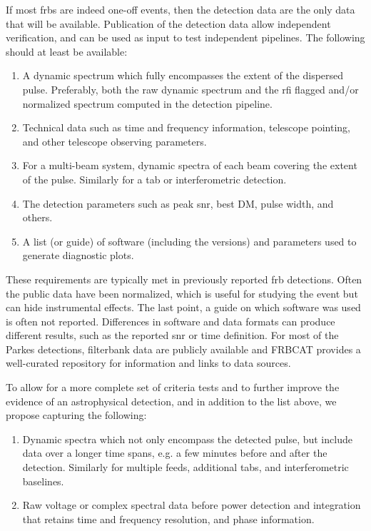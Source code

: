 \documentclass[a4paper,fleqn,usenatbib]{mnras}
\begin{document}
If most \glspl{frb} are indeed one-off events, then the detection data are the
only data that will be available. Publication of the detection data allow independent
verification, and can be used as input to test independent
pipelines. The following should at least be available:

\begin{enumerate}
    \item A dynamic spectrum which fully encompasses the extent of the dispersed
    pulse. Preferably, both the raw dynamic spectrum and the \gls{rfi} flagged
    and/or normalized spectrum computed in the detection pipeline.
    \item Technical data such as time and frequency information, telescope
    pointing, and other telescope observing parameters.
    \item For a multi-beam system, dynamic spectra of each beam covering the
    extent of the pulse. Similarly for a \gls{tab} or interferometric detection.
    \item The detection parameters such as peak \gls{snr}, best DM, pulse width,
    and others.
    \item A list (or guide) of software (including the versions) and parameters used
    to generate diagnostic plots.
\end{enumerate}

These requirements are typically met in previously reported \gls{frb}
detections. Often the public data have been normalized, which is useful for
studying the event but can hide instrumental effects.  The last point, a guide
on which software was used is often not reported.  Differences in software and
data formats can produce different results, such as the reported \gls{snr} or
time definition. For most of the Parkes detections, filterbank data are publicly
available and FRBCAT \citep{2016PASA...33...45P} provides a well-curated
repository for information and links to data sources.

To allow for a more complete set of criteria tests and to further improve the
evidence of an astrophysical detection, and in addition to the list above, we
propose capturing the following:

\begin{enumerate}
    \item Dynamic spectra which not only encompass the detected pulse, but
    include data over a longer time spans, e.g. a few minutes before and after
    the detection. Similarly for multiple feeds, additional \glspl{tab}, and
    interferometric baselines.
    \item Raw voltage or complex spectral data before power detection and
    integration that retains time and frequency resolution, and phase
    information.
\end{enumerate}
\end{document}
